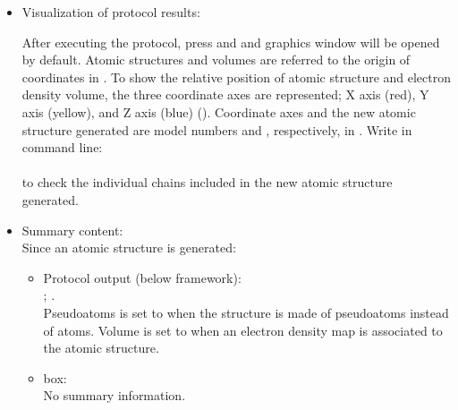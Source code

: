\begin{itemize}
 \item Visualization of protocol results:
 
 After executing the protocol, press  and and \chimera graphics window will be opened by default. Atomic structures and volumes are referred to the origin of coordinates in \chimera. To show the relative position of atomic structure and electron density volume, the three coordinate axes are represented; X axis (red), Y axis (yellow), and Z axis (blue) ().  Coordinate axes and the new atomic structure generated are model numbers  and , respectively, in \chimera {}. Write in \chimera command line:\\
    \\
 to check the individual chains included in the new atomic structure generated.
    
 \item Summary content:\\
 Since an atomic structure is generated:

    \begin{itemize}
     \item Protocol output (below \scipion framework):\\
      ; .\\Pseudoatoms is set to  when the structure is made of pseudoatoms instead of atoms. Volume is set to  when an electron density map is associated to the atomic structure.
     \item {} box:\\No summary information.\\
    \end{itemize}
\end{itemize}

